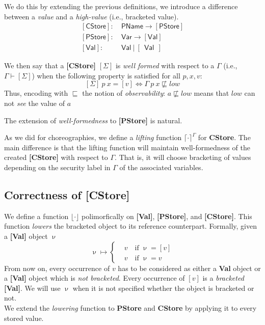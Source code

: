 \documentclass[12pt,a4paper,twoside]{book}
\begin{document}
We do this by extending the previous definitions, we introduce a difference between a \emph{value} and a \emph{high-value} (i.e., bracketed value).
\begin{align*}
	\mathsf{[CStore]}:&~\mathsf{PName} \rightarrow \mathsf{[PStore]}\\
	\mathsf{[PStore]}:&~\mathsf{Var} \rightarrow \mathsf{[Val]}\\
	\mathsf{[Val]}:&~ \mathsf{Val}~|~[~~\mathsf{Val}~~]
\end{align*}

We then say that a \textbf{[CStore]} $[\Sigma]$ is \emph{well formed} with respect to a $\Gamma$ (i.e., $\Gamma \vdash [\Sigma]$) when the following property is satisfied for all $p, x, v$:
$$
	[\Sigma]~p~x = [v] \iff \Gamma~p~x \not\sqsubseteq low
$$
Thus, encoding with $\sqsubseteq$ the notion of \emph{observability}: $a \not\sqsubseteq low$ means that $low$ can not \emph{see} the value of $a$

The extension of \emph{well-formedness} to \textbf{[PStore]} is natural.

As we did for choreographies, we define a \emph{lifting} function $\lceil \cdot \rceil^\Gamma$ for \textbf{CStore}. The main difference is that the lifting function will maintain well-formedness of the created \textbf{[CStore]} with respect to $\Gamma$. That is, it will choose bracketing of values depending on the security label in $\Gamma$ of the associated variables.

\subsection{Correctness of \textbf{[CStore]}}
We define a function $\lfloor \cdot \rfloor$ polimorfically on \textbf{[Val]}, \textbf{[PStore]}, and \textbf{[CStore]}. This function \emph{lowers} the bracketed object to its reference counterpart.
Formally, given a \textbf{[Val]} object $\upnu$
$$
\upnu \mapsto \begin{cases}
	&v \quad \text{if $\upnu = [v]$}\\
    &v \quad \text{if $\upnu = v$}
    \end{cases}
$$
From now on, every occurrence of $v$ has to be considered as either a \textbf{Val} object or a \textbf{[Val]} object which is \emph{not bracketed}. Every occurrence of $[v]$ is a \emph{bracketed} \textbf{[Val]}. We will use $\upnu$ when it is not specified whether the object is bracketed or not.\\
We extend the \emph{lowering} function to \textbf{PStore} and \textbf{CStore} by applying it to every stored value.
\end{document}
